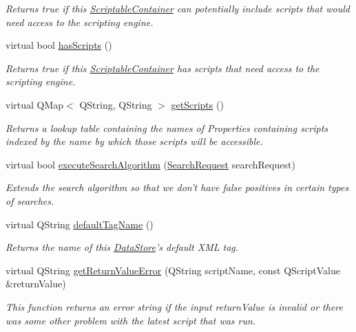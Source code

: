 \begin{DoxyCompactItemize}
\begin{DoxyCompactList}\small\item\em Returns true if this \hyperlink{class_picto_1_1_scriptable_container}{Scriptable\-Container} can potentially include scripts that would need access to the scripting engine. \end{DoxyCompactList}\item 
virtual bool \hyperlink{class_picto_1_1_analysis_script_holder_a2b488511105b335b8b06310647a9284b}{has\-Scripts} ()
\begin{DoxyCompactList}\small\item\em Returns true if this \hyperlink{class_picto_1_1_scriptable_container}{Scriptable\-Container} has scripts that need access to the scripting engine. \end{DoxyCompactList}\item 
virtual Q\-Map$<$ Q\-String, Q\-String $>$ \hyperlink{class_picto_1_1_analysis_script_holder_af6cfd31c85621d8c6658b4a6954615ca}{get\-Scripts} ()
\begin{DoxyCompactList}\small\item\em Returns a lookup table containing the names of Properties containing scripts indexed by the name by which those scripts will be accessible. \end{DoxyCompactList}\item 
virtual bool \hyperlink{class_picto_1_1_analysis_script_holder_ade68c9359a6d5c0782bfb5ee8650c0c7}{execute\-Search\-Algorithm} (\hyperlink{struct_search_request}{Search\-Request} search\-Request)
\begin{DoxyCompactList}\small\item\em Extends the search algorithm so that we don't have false positives in certain types of searches. \end{DoxyCompactList}\item 
virtual Q\-String \hyperlink{class_picto_1_1_analysis_script_holder_a8424afe1832f1b1b7c0753a9b19d3bc9}{default\-Tag\-Name} ()
\begin{DoxyCompactList}\small\item\em Returns the name of this \hyperlink{class_picto_1_1_data_store}{Data\-Store}'s default X\-M\-L tag. \end{DoxyCompactList}\item 
virtual Q\-String \hyperlink{class_picto_1_1_analysis_script_holder_a5f965ead2a8e7ddcced309a860c5901c}{get\-Return\-Value\-Error} (Q\-String script\-Name, const Q\-Script\-Value \&return\-Value)
\begin{DoxyCompactList}\small\item\em This function returns an error string if the input return\-Value is invalid or there was some other problem with the latest script that was run. \end{DoxyCompactList}\item 

\end{DoxyCompactItemize}
